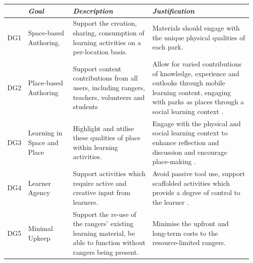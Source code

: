 {\RaggedRight
\begin{tabularx}{0.95\textwidth}{ p{10mm} | p{20mm} X X}
    {}
    & {\small\textit{Goal}} 
    & {\small\textit{Description}}
    & {\small\textit{Justification}}\\
    \midrule
    {\small DG1}
    & {\footnotesize Space-based \newline Authoring}. 
    & {\footnotesize Support the creation, sharing, consumption of learning activities on a per-location basis. }
    & {\footnotesize Materials should engage with the unique physical qualities of each park. } \\
    \hline
    {\small DG2} 
    & {\footnotesize Place-based \newline Authoring} 
    & {\footnotesize Support content contributions from all users, including rangers, teachers, volunteers and students}
    & \footnotesize Allow for varied contributions of knowledge, experience and outlooks through mobile learning content, engaging with parks as places through a social learning context \citep{Frohberg2009, Gryl2012}.  \\
    \hline
    {\small DG3}
    & {\footnotesize Learning in Space and Place} 
    & {\footnotesize Highlight and utilise these qualities of place within learning activities.}
    & {\footnotesize Engage with the physical and social learning context to enhance reflection and discussion \citep{Frohberg2009, Rogers2004} and encourage place-making \citep{McCarthy2005}.}  \\
    \hline
    {\small DG4}
    & {\footnotesize Learner Agency} 
    & {\footnotesize Support activities which require active and creative input from learners.}
    & {\footnotesize Avoid passive tool use, support scaffolded activities which provide a degree of control to the learner \citep{Frohberg2009, Land2015}}.  \\
    \hline
    {\small DG5}
    & {\footnotesize Minimal Upkeep} 
    & {\footnotesize Support the re-use of the rangers' existing learning material, be able to function without rangers being present.}
    & {\footnotesize Minimise the upfront and long-term costs to the resource-limited rangers.}  \\
\end{tabularx}
}
~\label{tab:InitialRequirements}

\setlength{\parskip}{1em}


